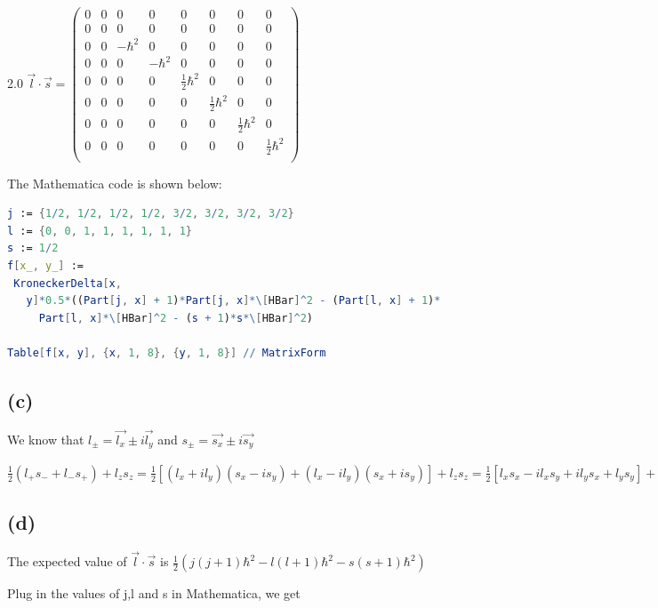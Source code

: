 \documentclass[12pt]{article}
\begin{document}
\begin{spacing}{2.0}
$\vec{l}\cdot \vec{s} =
\left(
\begin{array}{cccccccc}
 0 & 0 & 0 & 0 & 0 & 0 & 0 & 0 \\
 0 & 0 & 0 & 0 & 0 & 0 & 0 & 0 \\
 0 & 0 & -\hbar ^2 & 0 & 0 & 0 & 0 & 0 \\
 0 & 0 & 0 & -\hbar ^2 & 0 & 0 & 0 & 0 \\
 0 & 0 & 0 & 0 & \frac{1}{2}\hbar ^2 & 0 & 0 & 0 \\
 0 & 0 & 0 & 0 & 0 & \frac{1}{2}\hbar ^2 & 0 & 0 \\
 0 & 0 & 0 & 0 & 0 & 0 & \frac{1}{2}\hbar ^2 & 0 \\
 0 & 0 & 0 & 0 & 0 & 0 & 0 & \frac{1}{2}\hbar ^2 \\
\end{array}
\right)$

The Mathematica code is shown below:

\begin{lstlisting}[language=Mathematica,breaklines=true,frame=single]
j := {1/2, 1/2, 1/2, 1/2, 3/2, 3/2, 3/2, 3/2}
l := {0, 0, 1, 1, 1, 1, 1, 1}
s := 1/2
f[x_, y_] :=
 KroneckerDelta[x,
   y]*0.5*((Part[j, x] + 1)*Part[j, x]*\[HBar]^2 - (Part[l, x] + 1)*
     Part[l, x]*\[HBar]^2 - (s + 1)*s*\[HBar]^2)
 
Table[f[x, y], {x, 1, 8}, {y, 1, 8}] // MatrixForm
\end{lstlisting}

\subsection*{(c)}

We know that $l_{\pm}= \vec{l_x} \pm i \vec{l_y} $ and $s_{\pm}= \vec{s_x}\pm i \vec{s_y} $

$\frac{1}{2}(l_+s_- +l_-s_+)+ l_zs_z = \frac{1}{2}[(l_x+il_y)(s_x-is_y) + (l_x-il_y)(s_x+is_y)] + l_zs_z= \frac{1}{2}[l_xs_x -il_xs_y+ il_ys_x + l_ys_y] + l_zs_z= l_xs_x+l_ys_y+l_zs_z= \vec{l}\cdot \vec{s}$

\subsection*{(d)}

The expected value of $\vec{l} \cdot\vec{s}$ is $\frac{1}{2}(j(j+1)\hbar^2 - l(l+1)\hbar^2 - s(s+1)\hbar^2)$

Plug in the values of j,l and s in Mathematica, we get


\end{spacing}
\end{document}
